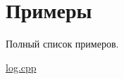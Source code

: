 \section{Примеры}
Полный список примеров.\begin{DoxyCompactItemize}
\item 
\hyperlink{log_8cpp-example}{log.\+cpp}
\end{DoxyCompactItemize}
